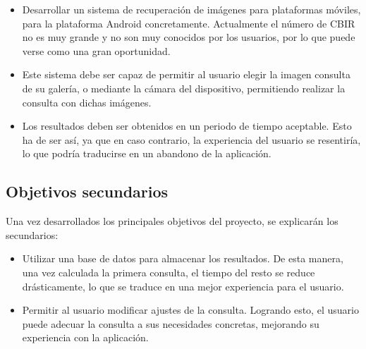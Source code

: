\begin{itemize}
  \item Desarrollar un sistema de recuperación de imágenes para plataformas móviles, para la plataforma Android concretamente. Actualmente el número de CBIR no es muy grande y no son muy conocidos por los usuarios, por lo que puede verse como una gran oportunidad.
  
  \item Este sistema debe ser capaz de permitir al usuario elegir la imagen consulta de su galería, o mediante la cámara del dispositivo, permitiendo realizar la consulta con dichas imágenes.
  
  \item Los resultados deben ser obtenidos en un periodo de tiempo aceptable. Esto ha de ser así, ya que en caso contrario, la experiencia del usuario se resentiría, lo que podría traducirse en un abandono de la aplicación.  
\end{itemize}


\subsection{Objetivos secundarios}

Una vez desarrollados los principales objetivos del proyecto, se explicarán los secundarios:

\begin{itemize}
  \item Utilizar una base de datos para almacenar los resultados. De esta manera, una vez calculada la primera consulta, el tiempo del resto se reduce drásticamente, lo que se traduce en una mejor experiencia para el usuario.

  \item Permitir al usuario modificar ajustes de la consulta. Logrando esto, el usuario puede adecuar la consulta a sus necesidades concretas, mejorando su experiencia con la aplicación.
\end{itemize}

